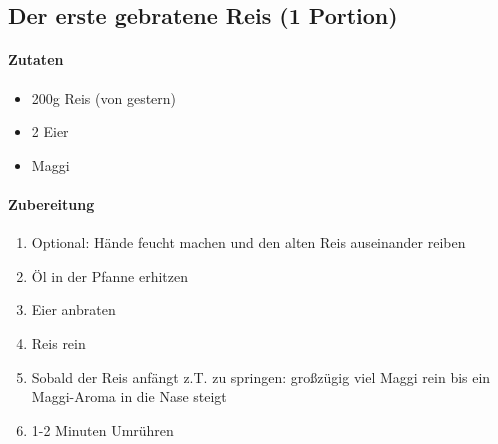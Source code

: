 \subsection{Der erste gebratene Reis (1 Portion)}
\paragraph{Zutaten}
\begin{itemize}[noitemsep]
	\item 200g Reis (von gestern)
	\item 2 Eier
	\item Maggi
\end{itemize}
\paragraph{Zubereitung}
\begin{enumerate}[noitemsep]
	\item Optional: Hände feucht machen und den alten Reis auseinander reiben
	\item Öl in der Pfanne erhitzen
	\item Eier anbraten
	\item Reis rein
	\item Sobald der Reis anfängt z.T. zu springen: großzügig viel Maggi rein bis ein Maggi-Aroma in die Nase steigt
	\item 1-2 Minuten Umrühren 
\end{enumerate}
